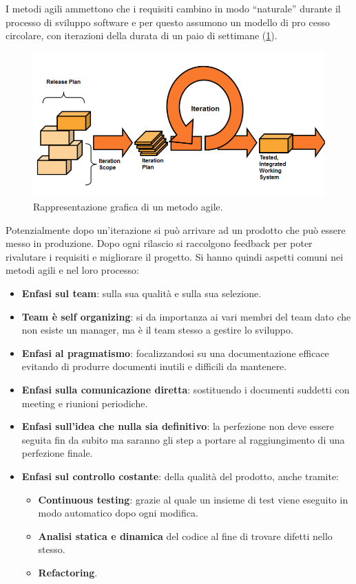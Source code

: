I metodi agili ammettono che i requisiti cambino in modo “naturale” durante il
processo di sviluppo software e per questo assumono un modello di pro cesso
circolare, con iterazioni della durata di un paio di settimane (\ref{fig:agili}).
\begin{figure}[!ht]
      \centering
      \includegraphics[scale=0.5]{img/agili/agili.png}
      \caption{Rappresentazione grafica di un metodo agile.}
      \label{fig:agili}
\end{figure}
Potenzialmente dopo un'iterazione si può arrivare ad un prodotto che può essere
messo in produzione. Dopo ogni rilascio si raccolgono feedback per poter rivalutare
i requisiti e migliorare il progetto. Si hanno quindi aspetti comuni nei metodi
agili e nel loro processo:
\begin{itemize}
      \item \textbf{Enfasi sul team}: sulla sua qualità e sulla sua selezione.
      \item \textbf{Team è self organizing}: si da importanza ai vari membri
            del team dato che non esiste un manager, ma è il team stesso a
            gestire lo sviluppo.
      \item \textbf{Enfasi al pragmatismo}: focalizzandosi su una documentazione
            efficace evitando di produrre documenti inutili e difficili da
            mantenere.
      \item \textbf{Enfasi sulla comunicazione diretta}: sostituendo i documenti
            suddetti con meeting e riunioni periodiche.
      \item \textbf{Enfasi sull'idea che nulla sia definitivo}: la perfezione non
            deve essere seguita fin da subito ma saranno gli step a portare al
            raggiungimento di una perfezione finale.
      \item \textbf{Enfasi sul controllo costante}: della qualità del prodotto,
            anche tramite:
            \begin{itemize}
                  \item \textbf{Continuous testing}: grazie al quale un insieme
                        di test viene eseguito in modo automatico dopo ogni modifica.
                  \item \textbf{Analisi statica e dinamica} del codice al fine
                        di trovare difetti nello stesso.
                  \item \textbf{Refactoring}.
            \end{itemize}
\end{itemize}
